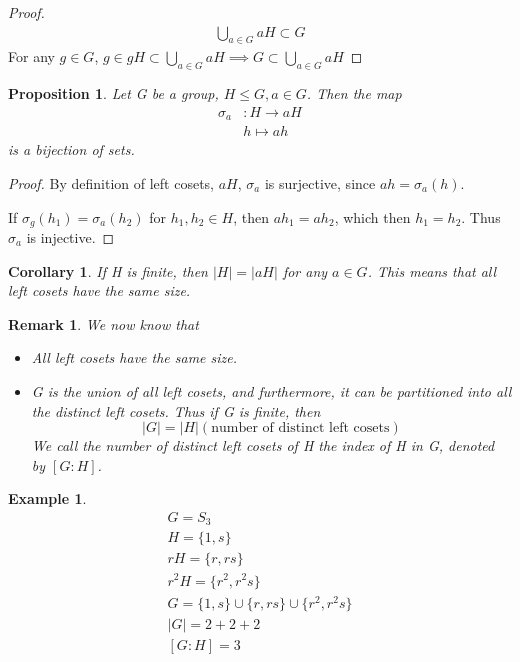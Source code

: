 \documentclass[11pt, oneside]{book}
\theoremstyle{break}
\newtheorem*{proof}{Proof}
\newtheorem{crly}{Corollary}[section]
\newtheorem{propo}{Proposition}[section]
\newtheorem*{remark}{Remark}
\newtheorem{eg}{Example}[section]
\begin{document}
\begin{proof}
    \begin{align*}
        \bigcup_{a \in G} aH \subset G
    \end{align*}
    For any $g \in G$, $g \in gH \subset \bigcup_{a \in G} aH \implies G \subset \bigcup_{a \in G} aH$
\end{proof}

\begin{propo}
    Let G be a group, $H \leq G, a \in G$. Then the map
    \begin{align*}
        \sigma_a &: H \to aH \\
            & h \mapsto ah
    \end{align*}
    is a bijection of sets.
\end{propo}

\begin{proof}
    By definition of left cosets, $aH$, $\sigma_a$ is surjective, since $ah = \sigma_a(h)$.

    If $\sigma_g(h_1) = \sigma_a(h_2)$ for $h_1, h_2 \in H$, then $ah_1 = ah_2$, which then $h_1 = h_2$. Thus $\sigma_a$ is injective.
\end{proof}

\begin{crly}
    If H is finite, then $|H| = |aH|$ for any $a \in G$. This means that all left cosets have the same size.
\end{crly}

\begin{remark}
    We now know that
    \begin{itemize}
        \item All left cosets have the same size.
        \item G is the union of all left cosets, and furthermore, it can be partitioned into all the distinct left cosets. Thus if G is finite, then
        \begin{equation}
            |G| = |H| (\text{number of distinct left cosets})
        \end{equation}
        We call the number of distinct left cosets of H the index of H in G, denoted by $[G : H]$.
    \end{itemize}
\end{remark}

\begin{eg}
    \begin{gather*}
        G = S_3 \\
        H = \{1, s\} \\
        rH = \{r, rs\} \\
        r^2H = \{r^2, r^2s\} \\
        G = \{1, s\} \cup \{r, rs\} \cup \{r^2, r^2 s\} \\
        |G| = 2 + 2 + 2 \\
        [G : H] = 3
    \end{gather*}
\end{eg}
\end{document}
